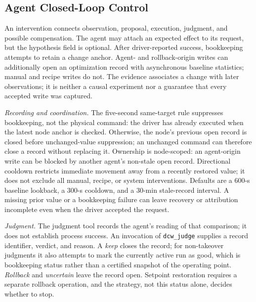 \subsection{Agent Closed-Loop Control}
\label{sec:loop}
An intervention connects observation, proposal, execution, judgment, and
possible compensation. The agent may attach an
expected effect to its request, but the hypothesis field is optional. After
driver-reported success, bookkeeping attempts to retain a change anchor.
Agent- and rollback-origin writes can additionally open an optimization
record with asynchronous baseline statistics; manual and recipe writes do
not. The evidence associates a change with later observations; it is neither
a causal experiment nor a guarantee that every accepted write was captured.

\emph{Recording and coordination.} The five-second same-target rule
suppresses bookkeeping, not the physical command: the driver has already executed when the latest node anchor is
checked. Otherwise, the node's previous open record is closed before
unchanged-value suppression; an unchanged command can therefore close a
record without replacing it. Ownership is node-scoped: an agent-origin write
can be blocked by another agent's non-stale open record. Directional cooldown
restricts immediate movement away from a recently restored value; it does not
exclude all manual, recipe, or system interventions. Defaults are a 600-s
baseline lookback, a 300-s cooldown, and a 30-min stale-record interval. A
missing prior value or a bookkeeping failure can leave recovery or
attribution incomplete even when the driver accepted the request.

\emph{Judgment.} The judgment tool records the agent's reading of that comparison; it does not
establish process success. An invocation of \texttt{dcw\_judge} supplies a
record identifier, verdict, and reason. A \emph{keep} closes the record; for
non-takeover judgments it also attempts to mark the currently active run as
good, which is bookkeeping status rather than a certified snapshot of the
operating point. \emph{Rollback} and \emph{uncertain} leave the record open.
Setpoint restoration requires a separate rollback operation, and the
strategy, not this status alone, decides whether to stop.

